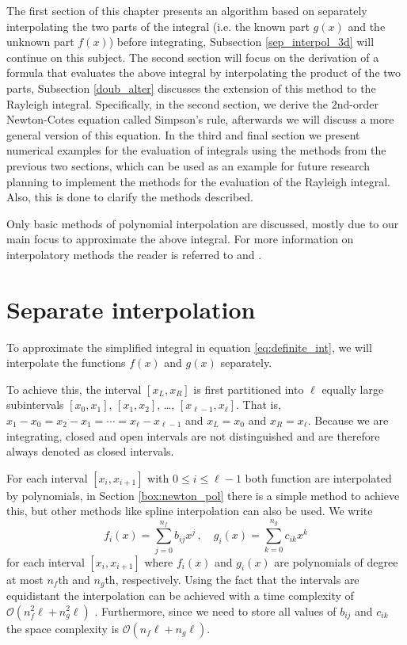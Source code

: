 The first section of this chapter presents an algorithm based on separately interpolating the two parts of the integral (i.e. the known part $g(x)$ and the unknown part $f(x)$) before integrating, Subsection \ref{sep_interpol_3d} will continue on this subject.
The second section will focus on the derivation of a formula that evaluates the above integral by interpolating the product of the two parts, Subsection \ref{doub_alter} discusses the extension of this method to the Rayleigh integral.
Specifically, in the second section, we derive the $2$nd-order Newton-Cotes equation called Simpson's rule, afterwards we will discuss a more general version of this equation.
In the third and final section we present numerical examples for the evaluation of integrals using the methods from the previous two sections, which can be used as an example for future research planning to implement the methods for the evaluation of the Rayleigh integral.
Also, this is done to clarify the methods described.

Only basic methods of polynomial interpolation are discussed, mostly due to our main focus to approximate the above integral.
For more information on interpolatory methods the reader is referred to \citeauthor{integration} \cite{integration} and \citeauthor{Book_Kees} \cite[Chapter 2]{Book_Kees}.


\section{Separate interpolation}
\label{sep_interpol}
To approximate the simplified integral in equation \ref{eq:definite_int}, we will interpolate the functions $f(x)$ and $g(x)$ separately.

To achieve this, the interval $[x_L,x_R]$ is first partitioned into $\ell$ equally large subintervals $[x_0, x_1]$, $[x_1, x_2]$, \dots, $[x_{\ell-1}, x_\ell]$. That is, $x_1 - x_0 = x_2 - x_1 = \cdots = x_\ell - x_{\ell-1}$ and $x_L = x_0$ and $x_R = x_\ell$. Because we are integrating, closed and open intervals are not distinguished and are therefore always denoted as closed intervals.

For each interval $[x_i, x_{i+1}]$ with $0 \leq i \leq \ell -1$ both function are interpolated by polynomials, in Section \ref{box:newton_pol} there is a simple method to achieve this, but other methods like spline interpolation \cite[Section 2.5]{Book_Kees} can also be used. We write
\begin{equation}
    f_{i}(x) = \sum_{j=0}^{n_f} b_{ij} x^j \,,  \quad
    g_{i}(x) = \sum_{k=0}^{n_g} c_{ik} x^k \nonumber
\end{equation}
for each interval $[x_i, x_{i+1}]$ where $f_i(x)$ and $g_i(x)$ are polynomials of degree at most $n_f$th and $n_g$th, respectively.
Using the fact that the intervals are equidistant the interpolation can be achieved with a time complexity of $\mathcal O(n_f^2 \ell + n_g^2 \ell)$ \cite{pol_inter}.
Furthermore, since we need to store all values of $b_{ij}$ and $c_{ik}$ the space complexity is $\mathcal O(n_f\ell + n_g\ell)$.


